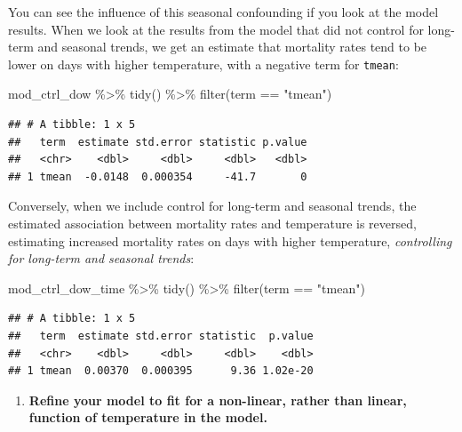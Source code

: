 \documentclass[
]{book}
\newenvironment{Shaded}{\begin{snugshade}}{\end{snugshade}}
\newcommand{\FunctionTok}[1]{\textcolor[rgb]{0.00,0.00,0.00}{#1}}
\newcommand{\NormalTok}[1]{#1}
\newcommand{\SpecialCharTok}[1]{\textcolor[rgb]{0.00,0.00,0.00}{#1}}
\newcommand{\StringTok}[1]{\textcolor[rgb]{0.31,0.60,0.02}{#1}}
\providecommand{\tightlist}{%
  \setlength{\itemsep}{0pt}\setlength{\parskip}{0pt}}
\begin{document}
You can see the influence of this seasonal confounding if you look at the model
results. When we look at the results from the model that did not control for
long-term and seasonal trends, we get an estimate that mortality rates tend to
be lower on days with higher temperature, with a negative term for \texttt{tmean}:

\begin{Shaded}
\begin{Highlighting}[]
\NormalTok{mod\_ctrl\_dow }\SpecialCharTok{\%\textgreater{}\%} 
  \FunctionTok{tidy}\NormalTok{() }\SpecialCharTok{\%\textgreater{}\%} 
  \FunctionTok{filter}\NormalTok{(term }\SpecialCharTok{==} \StringTok{"tmean"}\NormalTok{)}
\end{Highlighting}
\end{Shaded}

\begin{verbatim}
## # A tibble: 1 x 5
##   term  estimate std.error statistic p.value
##   <chr>    <dbl>     <dbl>     <dbl>   <dbl>
## 1 tmean  -0.0148  0.000354     -41.7       0
\end{verbatim}

Conversely, when we include control for long-term and seasonal trends, the
estimated association between mortality rates and temperature is reversed,
estimating increased mortality rates on days with higher temperature, \emph{controlling
for long-term and seasonal trends}:

\begin{Shaded}
\begin{Highlighting}[]
\NormalTok{mod\_ctrl\_dow\_time }\SpecialCharTok{\%\textgreater{}\%} 
  \FunctionTok{tidy}\NormalTok{() }\SpecialCharTok{\%\textgreater{}\%} 
  \FunctionTok{filter}\NormalTok{(term }\SpecialCharTok{==} \StringTok{"tmean"}\NormalTok{)}
\end{Highlighting}
\end{Shaded}

\begin{verbatim}
## # A tibble: 1 x 5
##   term  estimate std.error statistic  p.value
##   <chr>    <dbl>     <dbl>     <dbl>    <dbl>
## 1 tmean  0.00370  0.000395      9.36 1.02e-20
\end{verbatim}

\begin{enumerate}
\def\labelenumi{\arabic{enumi}.}
\setcounter{enumi}{2}
\tightlist
\item
  \textbf{Refine your model to fit for a non-linear, rather than linear, function
  of temperature in the model.}
\end{enumerate}
\end{document}
